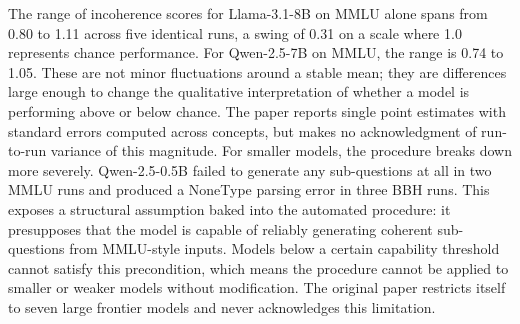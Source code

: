 \documentclass[sigconf,authordraft]{acmart}
\begin{document}
The range of incoherence scores for Llama-3.1-8B on MMLU alone spans from 0.80 to 1.11 across five identical runs, a swing of 0.31 on a scale where 1.0 represents chance performance. For Qwen-2.5-7B on MMLU, the range is 0.74 to 1.05. These are not minor fluctuations around a stable mean; they are differences large enough to change the qualitative interpretation of whether a model is performing above or below chance. The paper reports single point estimates with standard errors computed across concepts, but makes no acknowledgment of run-to-run variance of this magnitude.
For smaller models, the procedure breaks down more severely. Qwen-2.5-0.5B failed to generate any sub-questions at all in two MMLU runs and produced a NoneType parsing error in three BBH runs. This exposes a structural assumption baked into the automated procedure: it presupposes that the model is capable of reliably generating coherent sub-questions from MMLU-style inputs. Models below a certain capability threshold cannot satisfy this precondition, which means the procedure cannot be applied to smaller or weaker models without modification. The original paper restricts itself to seven large frontier models and never acknowledges this limitation.
\end{document}
